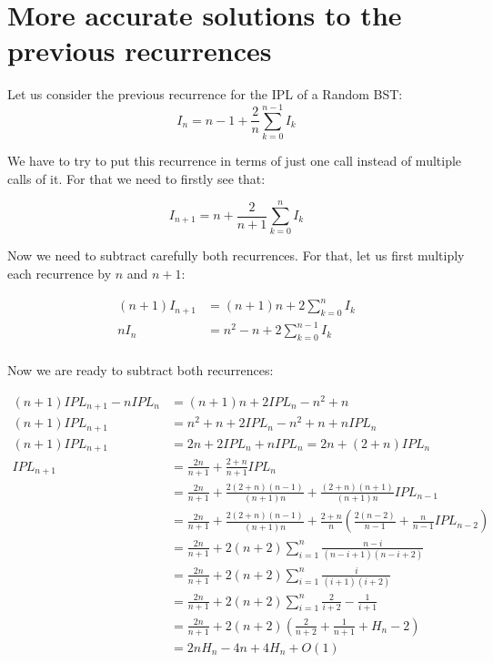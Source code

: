 \appendix
\section{More accurate solutions to the previous recurrences}\label{ap:rec}
Let us consider the previous recurrence for the IPL of a Random BST:
$$
I_n = n -1 + \frac{2}{n} \sum\limits_{k = 0}^{n-1} I_k
$$

We have to try to put this recurrence in terms of just one call instead of multiple calls of it. For that we need to firstly see that:

$$
I_{n+1} = n + \frac{2}{n+1} \sum\limits_{k = 0}^{n} I_k
$$

Now we need to subtract carefully both recurrences. For that, let us first multiply each recurrence by $n$ and $n+1$:

\begin{align*}
    (n+1) I_{n+1} &= (n+1)n + 2 \sum\limits_{k = 0}^{n} I_k \\
    nI_n &= n^2 -n + 2 \sum\limits_{k = 0}^{n-1} I_k \\
\end{align*}

Now we are ready to subtract both recurrences:

\begin{align*}
    (n+1) IPL_{n+1} - nIPL_n &= (n+1)n + 2 IPL_n - n^2 + n \\
    (n+1) IPL_{n+1} &= n^2 + n + 2IPL_n - n^2 + n + nIPL_n \\
    (n+1) IPL_{n+1} &= 2n + 2IPL_n + nIPL_n = 2n + (2+n)IPL_n \\
    IPL_{n+1} &= \frac{2n}{n+1} + \frac{2+n}{n+1} IPL_n \\
     &= \frac{2n}{n+1} + \frac{2(2+n)(n-1)}{(n+1)n} + \frac{(2+n)(n+1)}{(n+1)n}IPL_{n-1} \\
     &= \frac{2n}{n+1} + \frac{2(2+n)(n-1)}{(n+1)n} + \frac{2+n}{n}(\frac{2(n-2)}{n-1} + \frac{n}{n-1} IPL_{n-2}) \\
     &= \frac{2n}{n+1} + 2(n+2)\sum\limits_{i = 1}^{n} \frac{n-i}{(n-i+1)(n-i+2)} \\
     &= \frac{2n}{n+1} + 2(n+2)\sum\limits_{i = 1}^{n} \frac{i}{(i+1)(i+2)} \\
     &= \frac{2n}{n+1} + 2(n+2)\sum\limits_{i = 1}^{n} \frac{2}{i+2} - \frac{1}{i+1} \\
     &= \frac{2n}{n+1} + 2(n+2)(\frac{2}{n+2} + \frac{1}{n+1} + H_n - 2) \\
     &= 2nH_n - 4n + 4H_n + O(1)
\end{align*}

